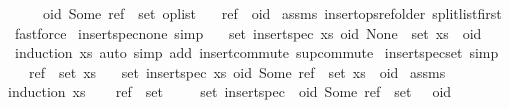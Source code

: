 \begin{isabellebody}
\ \ \ \ \ {\isachardoublequoteopen}{\isacharparenleft}oid{\isacharcomma}\ Some\ ref{\isacharparenright}\ {\isasymin}\ set\ op{\isacharunderscore}list{\isachardoublequoteclose}\isanewline
\ \ \ {\isachardoublequoteopen}ref\ {\isacharless}\ oid{\isachardoublequoteclose}\isanewline
%
\isadelimproof
%
\endisadelimproof
%
\isatagproof
{}\isamarkupfalse%
\ assms\ insert{\isacharunderscore}ops{\isacharunderscore}ref{\isacharunderscore}older\ split{\isacharunderscore}list{\isacharunderscore}first\ \isamarkupfalse%
\ fastforce%
\endisatagproof
{\isafoldproof}%
%
\isadelimproof
%
\endisadelimproof
%
\isamarkuptrue%
\isamarkupfalse%
\ insert{\isacharunderscore}spec{\isacharunderscore}none\ {\isacharbrackleft}simp{\isacharbrackright}{\isacharcolon}\isanewline
\ \ \ {\isachardoublequoteopen}set\ {\isacharparenleft}insert{\isacharunderscore}spec\ xs\ {\isacharparenleft}oid{\isacharcomma}\ None{\isacharparenright}{\isacharparenright}\ {\isacharequal}\ set\ xs\ {\isasymunion}\ {\isacharbraceleft}oid{\isacharbraceright}{\isachardoublequoteclose}\isanewline
%
\isadelimproof
%
\endisadelimproof
%
\isatagproof
{}\isamarkupfalse%
\ {\isacharparenleft}induction\ xs{\isacharcomma}\ auto\ simp\ add{\isacharcolon}\ insert{\isacharunderscore}commute\ sup{\isacharunderscore}commute{\isacharparenright}%
\endisatagproof
{\isafoldproof}%
%
\isadelimproof
\isanewline
%
\endisadelimproof
\isanewline
{}\isamarkupfalse%
\ insert{\isacharunderscore}spec{\isacharunderscore}set\ {\isacharbrackleft}simp{\isacharbrackright}{\isacharcolon}\isanewline
\ \ \ {\isachardoublequoteopen}ref\ {\isasymin}\ set\ xs{\isachardoublequoteclose}\isanewline
\ \ \ {\isachardoublequoteopen}set\ {\isacharparenleft}insert{\isacharunderscore}spec\ xs\ {\isacharparenleft}oid{\isacharcomma}\ Some\ ref{\isacharparenright}{\isacharparenright}\ {\isacharequal}\ set\ xs\ {\isasymunion}\ {\isacharbraceleft}oid{\isacharbraceright}{\isachardoublequoteclose}\isanewline
%
\isadelimproof
%
\endisadelimproof
%
\isatagproof
{}\isamarkupfalse%
\ assms\ \isamarkupfalse%
{\isacharparenleft}induction\ xs{\isacharparenright}\isanewline
\ \ \isamarkupfalse%
\ {\isachardoublequoteopen}ref\ {\isasymin}\ set\ {\isacharbrackleft}{\isacharbrackright}{\isachardoublequoteclose}\isanewline
\ \ \isamarkupfalse%
\ {\isachardoublequoteopen}set\ {\isacharparenleft}insert{\isacharunderscore}spec\ {\isacharbrackleft}{\isacharbrackright}\ {\isacharparenleft}oid{\isacharcomma}\ Some\ ref{\isacharparenright}{\isacharparenright}\ {\isacharequal}\ set\ {\isacharbrackleft}{\isacharbrackright}\ {\isasymunion}\ {\isacharbraceleft}oid{\isacharbraceright}{\isachardoublequoteclose}\isanewline

\end{isabellebody}
